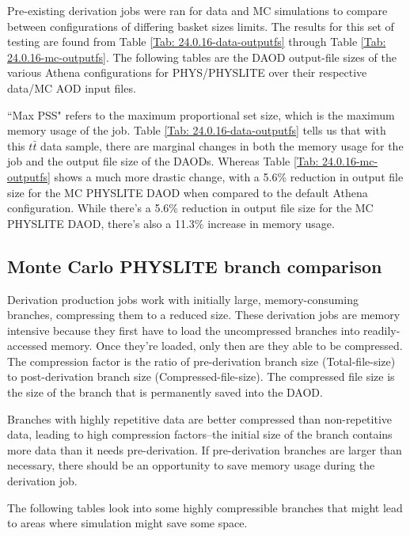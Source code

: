 Pre-existing derivation jobs were ran for data and MC simulations to compare between configurations of differing basket sizes limits. 
The results for this set of testing are found from Table \ref{Tab: 24.0.16-data-outputfs} through Table \ref{Tab: 24.0.16-mc-outputfs}. 
The following tables are the DAOD output-file sizes of the various Athena configurations for PHYS/PHYSLITE over their respective data/MC AOD input files. 





``Max PSS" refers to the maximum proportional set size, which is the maximum memory usage of the job.
Table \ref{Tab: 24.0.16-data-outputfs} tells us that with this $t\bar{t}$ data sample, there are marginal changes in both the memory usage for the job and the output file size of the DAODs. 
Whereas Table \ref{Tab: 24.0.16-mc-outputfs} shows a much more drastic change, with a 5.6\% reduction in output file size for the MC PHYSLITE DAOD when compared to the default Athena configuration.
While there's a 5.6\% reduction in output file size for the MC PHYSLITE DAOD, there's also a 11.3\% increase in memory usage. 


\subsection{Monte Carlo PHYSLITE branch comparison}
\label{sec:DAODProd_Results_Monte}

Derivation production jobs work with initially large, memory-consuming branches, compressing them to a reduced size. 
These derivation jobs are memory intensive because they first have to load the uncompressed branches into readily-accessed memory. 
Once they're loaded, only then are they able to be compressed. 
The compression factor is the ratio of pre-derivation branch size (Total-file-size) to post-derivation branch size (Compressed-file-size). 
The compressed file size is the size of the branch that is permanently saved into the DAOD.  

Branches with highly repetitive data are better compressed than non-repetitive data, leading to high compression factors--the initial size of the branch contains more data than it needs pre-derivation. 
If pre-derivation branches are larger than necessary, there should be an opportunity to save memory usage during the derivation job. 

The following tables look into some highly compressible branches that might lead to areas where simulation might save some space. 

